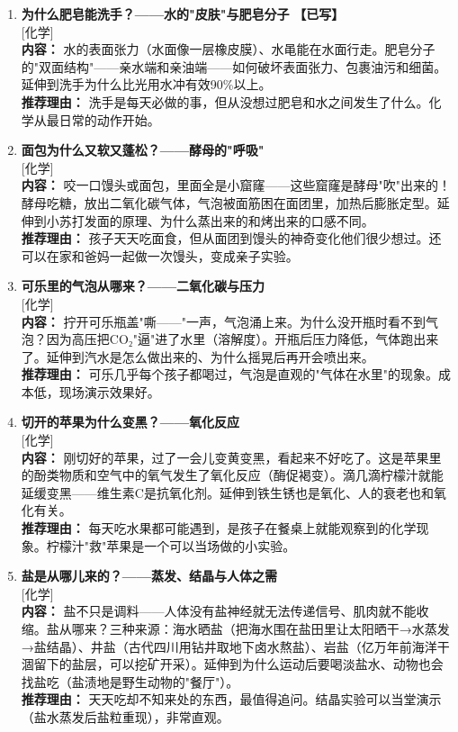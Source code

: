 \documentclass[a4paper,12pt]{ctexart}
\newcommand{\tagchemistry}{\textcolor{chemistry}{\small [化学]}}
\newcommand{\done}{\textcolor{donegreen}{\textbf{【已写】}}}
\begin{document}
\begin{enumerate}

\item[\textbf{第11课}] \textbf{为什么肥皂能洗手？——水的"皮肤"与肥皂分子} \done \\
\tagchemistry \\
\textbf{内容：} 水的表面张力（水面像一层橡皮膜）、水黾能在水面行走。肥皂分子的"双面结构"——亲水端和亲油端——如何破坏表面张力、包裹油污和细菌。延伸到洗手为什么比光用水冲有效90\%以上。\\
\textbf{推荐理由：} 洗手是每天必做的事，但从没想过肥皂和水之间发生了什么。化学从最日常的动作开始。

\item[\textbf{第12课}] \textbf{面包为什么又软又蓬松？——酵母的"呼吸"} \\
\tagchemistry \\
\textbf{内容：} 咬一口馒头或面包，里面全是小窟窿——这些窟窿是酵母"吹"出来的！酵母吃糖，放出二氧化碳气体，气泡被面筋困在面团里，加热后膨胀定型。延伸到小苏打发面的原理、为什么蒸出来的和烤出来的口感不同。\\
\textbf{推荐理由：} 孩子天天吃面食，但从面团到馒头的神奇变化他们很少想过。还可以在家和爸妈一起做一次馒头，变成亲子实验。

\item[\textbf{第13课}] \textbf{可乐里的气泡从哪来？——二氧化碳与压力} \\
\tagchemistry \\
\textbf{内容：} 拧开可乐瓶盖"嘶——"一声，气泡涌上来。为什么没开瓶时看不到气泡？因为高压把CO₂"逼"进了水里（溶解度）。开瓶后压力降低，气体跑出来了。延伸到汽水是怎么做出来的、为什么摇晃后再开会喷出来。\\
\textbf{推荐理由：} 可乐几乎每个孩子都喝过，气泡是直观的"气体在水里"的现象。成本低，现场演示效果好。

\item[\textbf{第14课}] \textbf{切开的苹果为什么变黑？——氧化反应} \\
\tagchemistry \\
\textbf{内容：} 刚切好的苹果，过了一会儿变黄变黑，看起来不好吃了。这是苹果里的酚类物质和空气中的氧气发生了氧化反应（酶促褐变）。滴几滴柠檬汁就能延缓变黑——维生素C是抗氧化剂。延伸到铁生锈也是氧化、人的衰老也和氧化有关。\\
\textbf{推荐理由：} 每天吃水果都可能遇到，是孩子在餐桌上就能观察到的化学现象。柠檬汁"救"苹果是一个可以当场做的小实验。

\item[\textbf{第15课}] \textbf{盐是从哪儿来的？——蒸发、结晶与人体之需} \\
\tagchemistry \\
\textbf{内容：} 盐不只是调料——人体没有盐神经就无法传递信号、肌肉就不能收缩。盐从哪来？三种来源：海水晒盐（把海水围在盐田里让太阳晒干→水蒸发→盐结晶）、井盐（古代四川用钻井取地下卤水熬盐）、岩盐（亿万年前海洋干涸留下的盐层，可以挖矿开采）。延伸到为什么运动后要喝淡盐水、动物也会找盐吃（盐渍地是野生动物的"餐厅"）。\\
\textbf{推荐理由：} 天天吃却不知来处的东西，最值得追问。结晶实验可以当堂演示（盐水蒸发后盐粒重现），非常直观。

\end{enumerate}
\end{document}
